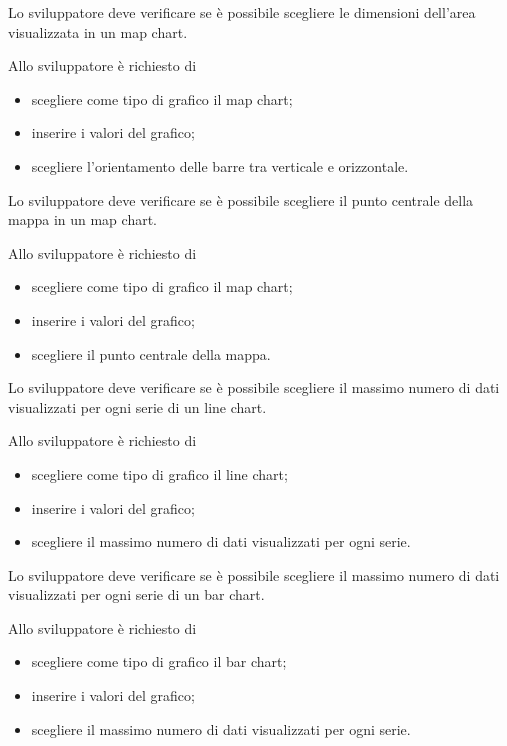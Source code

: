 	Lo sviluppatore deve verificare se è possibile scegliere le dimensioni dell'area visualizzata in un map chart.

		Allo sviluppatore è richiesto di
		\begin{itemize}
			\item scegliere come tipo di grafico il map chart;
			\item inserire i valori del grafico;
			\item scegliere l'orientamento delle barre tra verticale e orizzontale.
		\end{itemize}

	Lo sviluppatore deve verificare se è possibile scegliere il punto centrale della mappa in un map chart.

		Allo sviluppatore è richiesto di
		\begin{itemize}
			\item scegliere come tipo di grafico il map chart;
			\item inserire i valori del grafico;
			\item scegliere il punto centrale della mappa.
		\end{itemize}

	Lo sviluppatore deve verificare se è possibile scegliere il massimo numero di dati visualizzati per ogni serie di un line chart.

		Allo sviluppatore è richiesto di
		\begin{itemize}
			\item scegliere come tipo di grafico il line chart;
			\item inserire i valori del grafico;
			\item scegliere il massimo numero di dati visualizzati per ogni serie.
		\end{itemize}

	Lo sviluppatore deve verificare se è possibile scegliere il massimo numero di dati visualizzati per ogni serie di un bar chart.

		Allo sviluppatore è richiesto di
		\begin{itemize}
			\item scegliere come tipo di grafico il bar chart;
			\item inserire i valori del grafico;
			\item scegliere il massimo numero di dati visualizzati per ogni serie.
		\end{itemize}

